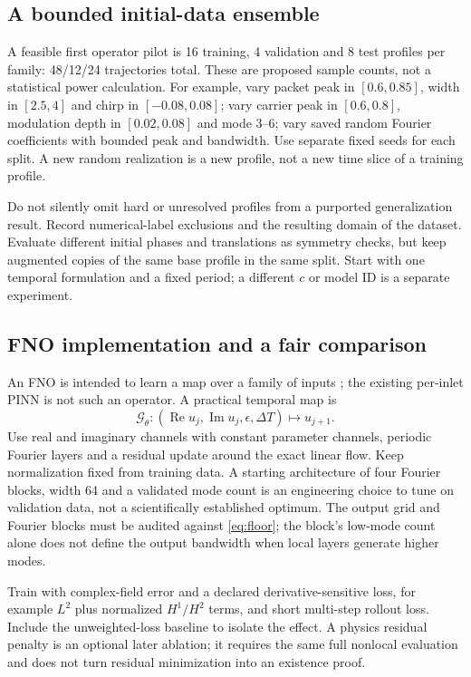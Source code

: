 \subsection{A bounded initial-data ensemble}
A feasible first operator pilot is 16 training, 4 validation and 8 test profiles per family: 48/12/24 trajectories total. These are proposed sample counts, not a statistical power calculation. For example, vary packet peak in $[0.6,0.85]$, width in $[2.5,4]$ and chirp in $[-0.08,0.08]$; vary carrier peak in $[0.6,0.8]$, modulation depth in $[0.02,0.08]$ and mode 3--6; vary saved random Fourier coefficients with bounded peak and bandwidth. Use separate fixed seeds for each split. A new random realization is a new profile, not a new time slice of a training profile.

Do not silently omit hard or unresolved profiles from a purported generalization result. Record numerical-label exclusions and the resulting domain of the dataset. Evaluate different initial phases and translations as symmetry checks, but keep augmented copies of the same base profile in the same split. Start with one temporal formulation and a fixed period; a different $c$ or model ID is a separate experiment.
\clearpage
\subsection{FNO implementation and a fair comparison}
An FNO is intended to learn a map over a family of inputs \cite{fno}; the existing per-inlet PINN is not such an operator. A practical temporal map is
\[
 \mathcal G_\theta:(\operatorname{Re}u_j,\operatorname{Im}u_j,\epsilon,\Delta T)
       \longmapsto u_{j+1}.
\]
Use real and imaginary channels with constant parameter channels, periodic Fourier layers and a residual update around the exact linear flow. Keep normalization fixed from training data. A starting architecture of four Fourier blocks, width 64 and a validated mode count is an engineering choice to tune on validation data, not a scientifically established optimum. The output grid and Fourier blocks must be audited against \eqref{eq:floor}; the block's low-mode count alone does not define the output bandwidth when local layers generate higher modes.

Train with complex-field error and a declared derivative-sensitive loss, for example $L^2$ plus normalized $H^1/H^2$ terms, and short multi-step rollout loss. Include the unweighted-loss baseline to isolate the effect. A physics residual penalty is an optional later ablation; it requires the same full nonlocal evaluation and does not turn residual minimization into an existence proof.

